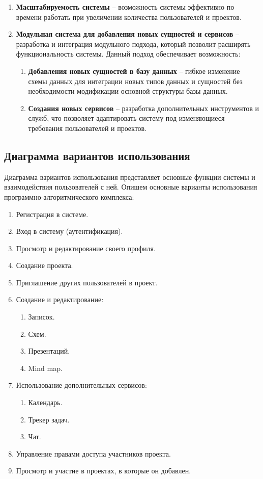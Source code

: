\begin{enumerate}[wide=12.5mm, leftmargin=12.5mm]
    \item \textbf{Масштабируемость системы} -- возможность системы эффективно по времени работать при увеличении количества пользователей и проектов.
    \item \textbf{Модульная система для добавления новых сущностей и сервисов} -- разработка и интеграция модульного подхода, который позволит расширять функциональность системы. Данный подход обеспечивает возможность:
    \begin{enumerate}
        \item \textbf{Добавления новых сущностей в базу данных} -- гибкое изменение схемы данных для интеграции новых типов данных и сущностей без необходимости модификации основной структуры базы данных.
        \item \textbf{Создания новых сервисов} -- разработка дополнительных инструментов и служб, что позволяет адаптировать систему под изменяющиеся требования пользователей и проектов.
    \end{enumerate}  
\end{enumerate}

\clearpage

\subsection{Диаграмма вариантов использования}

Диаграмма вариантов использования представляет основные функции системы и взаимодействия пользователей с ней. 
Опишем основные варианты использования программно-алгоритмического комплекса:

\begin{enumerate}[leftmargin=1.6\parindent]
    \item Регистрация в системе.
    \item Вход в систему (аутентификация).
    \item Просмотр и редактирование своего профиля.
    \item Создание проекта.
    \item Приглашение других пользователей в проект.
    \item Создание и редактирование:
    \begin{enumerate}
        \item Записок.
        \item Схем.
        \item Презентаций.
        \item Mind map.
    \end{enumerate}
    \item Использование дополнительных сервисов:
    \begin{enumerate}
        \item Календарь.
        \item Трекер задач.
        \item Чат.
    \end{enumerate}
    \item Управление правами доступа участников проекта.
    \item Просмотр и участие в проектах, в которые он добавлен.
\end{enumerate}
\clearpage

